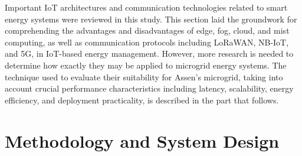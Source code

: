 \documentclass[conference]{IEEEtran}
\begin{document}
\vspace{5pt}
\noindent
Important IoT architectures and communication technologies related to smart energy systems were reviewed in this study. This section laid the groundwork for comprehending the advantages and disadvantages of edge, fog, cloud, and mist computing, as well as communication protocols including LoRaWAN, NB-IoT, and 5G, in IoT-based energy management. However, more research is needed to determine how exactly they may be applied to microgrid energy systems. The technique used to evaluate their suitability for Assen's microgrid, taking into account crucial performance characteristics including latency, scalability, energy efficiency, and deployment practicality, is described in the part that follows.
\vspace{5pt}

\section{Methodology and System Design}
\end{document}
